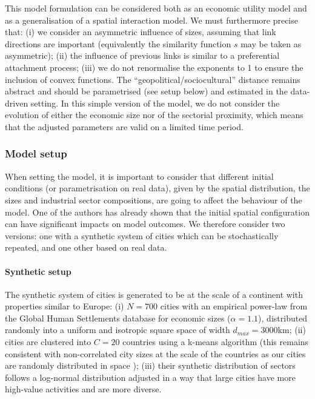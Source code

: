 \documentclass[10pt,letterpaper]{article}
\begin{document}
This model formulation can be considered both as an economic utility model and as a generalisation of a spatial interaction model. We must furthermore precise that: (i) we consider an asymmetric influence of sizes, assuming that link directions are important (equivalently the similarity function $s$ may be taken as asymmetric); (ii) the influence of previous links is similar to a preferential attachment process; (iii) we do not renormalise the exponents to 1 to ensure the inclusion of convex functions. The ``geopolitical/sociocultural'' distance remains abstract and should be parametrised (see setup below) and estimated in the data-driven setting. In this simple version of the model, we do not consider the evolution of either the economic size nor of the sectorial proximity, which means that the adjusted parameters are valid on a limited time period.


\subsubsection*{Model setup}

When setting the model, it is important to consider that different initial conditions (or parametrisation on real data), given by the spatial distribution, the sizes and industrial sector compositions, are going to affect the behaviour of the model. One of the authors \cite{raimbault2019space} has already shown that the initial spatial configuration can have significant impacts on model outcomes. We therefore consider two versions: one with a synthetic system of cities which can be stochastically repeated, and one other based on real data.


\paragraph{Synthetic setup}

The synthetic system of cities is generated to be at the scale of a continent with properties similar to Europe: (i) $N=700$ cities with an empirical power-law from the Global Human Settlements database for economic sizes ($\alpha = 1.1$), distributed randomly into a uniform and isotropic square space of width $d_{max}=3000$km;
(ii) cities are clustered into $C = 20$ countries using a k-means algorithm (this remains consistent with non-correlated city sizes at the scale of the countries as our cities are randomly distributed in space \cite{simini2019testing});
(iii) their synthetic distribution of sectors follows a log-normal distribution adjusted in a way that large cities have more high-value activities and are more diverse.
\end{document}
